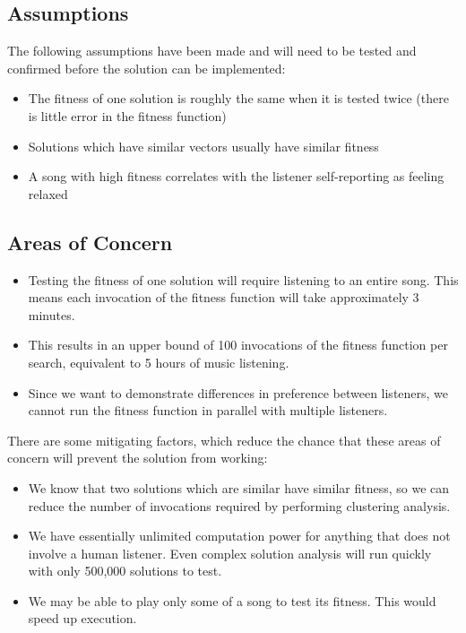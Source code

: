 \documentclass{article}
\begin{document}
	\subsection{Assumptions}
	The following assumptions have been made and will need to be tested and confirmed before the solution can be implemented:
	
	\begin{itemize}
		\item The fitness of one solution is roughly the same when it is tested twice (there is little error in the fitness function)
		\item Solutions which have similar vectors usually have similar fitness
		\item A song with high fitness correlates with the listener self-reporting as feeling relaxed
	\end{itemize}

	\subsection{Areas of Concern}
	\begin{itemize}
		\item Testing the fitness of one solution will require listening to an entire song. This means each invocation of the fitness function will take approximately 3 minutes.
		\item This results in an upper bound of 100 invocations of the fitness function per search, equivalent to 5 hours of music listening.
		\item Since we want to demonstrate differences in preference between listeners, we cannot run the fitness function in parallel with multiple listeners.
	\end{itemize}

	There are some mitigating factors, which reduce the chance that these areas of concern will prevent the solution from working:
	
	\begin{itemize}
		\item We know that two solutions which are similar have similar fitness, so we can reduce the number of invocations required by performing clustering analysis.
		\item We have essentially unlimited computation power for anything that does not involve a human listener. Even complex solution analysis will run quickly with only 500,000 solutions to test.
		\item We may be able to play only some of a song to test its fitness. This would speed up execution.
	\end{itemize}
\end{document}

